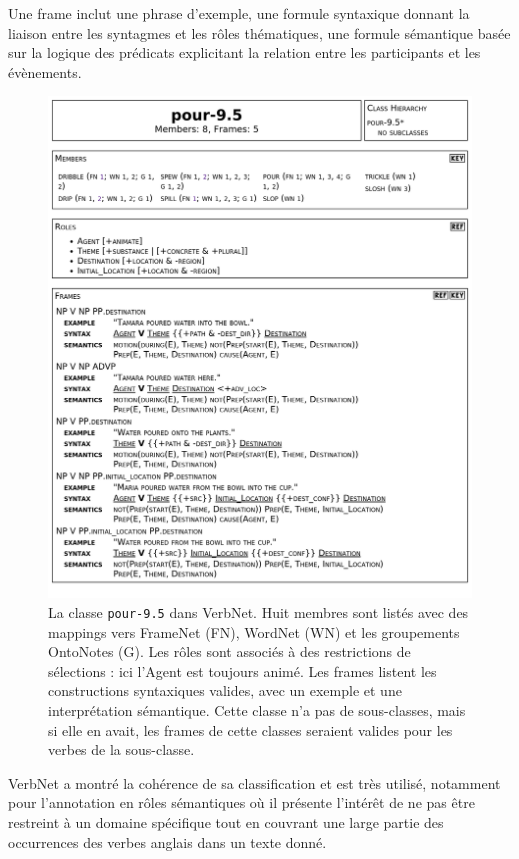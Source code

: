 Une frame inclut une phrase d'exemple, une formule syntaxique donnant la
liaison entre les syntagmes et les rôles thématiques, une formule sémantique
basée sur la logique des prédicats explicitant la relation entre les
participants et les évènements.

\begin{figure}[p]
    \centering
    \includegraphics[width=\textwidth]{fig/verbnet_pour_class.png}
    \caption{\label{fig:exemple_verbnet}La classe \texttt{pour-9.5} dans
    VerbNet. Huit membres sont listés avec des mappings vers FrameNet (FN),
    WordNet (WN) et les groupements OntoNotes (G). Les rôles sont associés à
    des restrictions de sélections : ici l'Agent est toujours animé. Les frames
    listent les constructions syntaxiques valides, avec un exemple et une
    interprétation sémantique. Cette classe n'a pas de sous-classes, mais si
    elle en avait, les frames de cette classes seraient valides pour les verbes
    de la sous-classe.}
\end{figure}

VerbNet a montré la cohérence de sa classification et est très utilisé,
notamment pour l'annotation en rôles sémantiques
\citep{swier2005exploiting,palmer2013semantic} où il présente l'intérêt de ne
pas être restreint à un domaine spécifique tout en couvrant une large partie
des occurrences des verbes anglais dans un texte donné.

